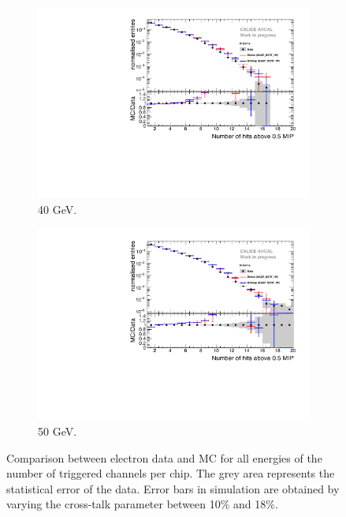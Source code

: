 \begin{figure}[htbp!]
\begin{subfigure}[t]{0.5\textwidth}
		\includegraphics[width=1\textwidth]{chap5/fig_AHCAL_timing/Electrons/Comparison_SimData_Electrons_nHits_40GeV.pdf}
		\caption{40 GeV.}\label{fig:elec_sim_data_nHits_40GeV}
	\end{subfigure}
	\hfill
	\begin{subfigure}[t]{0.5\textwidth}
		\centering
		\includegraphics[width=1\textwidth]{chap5/fig_AHCAL_timing/Electrons/Comparison_SimData_Electrons_nHits_50GeV.pdf}
		\caption{50 GeV.}\label{fig:elec_sim_data_nHits_50GeV}
	\end{subfigure}
	\caption{Comparison between electron data and MC for all energies of the number of triggered channels per chip. The grey area represents the statistical error of the data. Error bars in simulation are obtained by varying the cross-talk parameter between 10\% and 18\%.}
	\label{fig:sim_data_elec_nHits}
\end{figure}

